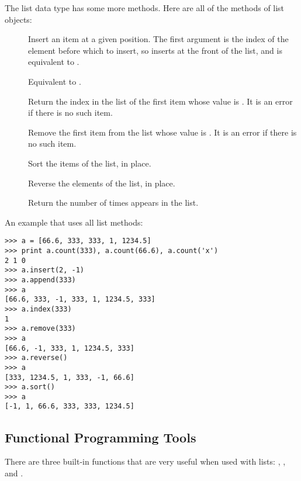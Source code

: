 \documentclass{manual}
\begin{document}
The list data type has some more methods.  Here are all of the methods
of list objects:

\begin{description}

\item[]
Insert an item at a given position.  The first argument is the index of
the element before which to insert, so  inserts at
the front of the list, and  is equivalent to
.

\item[]
Equivalent to .

\item[]
Return the index in the list of the first item whose value is .
It is an error if there is no such item.

\item[]
Remove the first item from the list whose value is .
It is an error if there is no such item.

\item[]
Sort the items of the list, in place.

\item[]
Reverse the elements of the list, in place.

\item[]
Return the number of times  appears in the list.

\end{description}

An example that uses all list methods:

\begin{verbatim}
>>> a = [66.6, 333, 333, 1, 1234.5]
>>> print a.count(333), a.count(66.6), a.count('x')
2 1 0
>>> a.insert(2, -1)
>>> a.append(333)
>>> a
[66.6, 333, -1, 333, 1, 1234.5, 333]
>>> a.index(333)
1
>>> a.remove(333)
>>> a
[66.6, -1, 333, 1, 1234.5, 333]
>>> a.reverse()
>>> a
[333, 1234.5, 1, 333, -1, 66.6]
>>> a.sort()
>>> a
[-1, 1, 66.6, 333, 333, 1234.5]
\end{verbatim}

\subsection{Functional Programming Tools \label{functional}}

There are three built-in functions that are very useful when used with
lists: , , and .
\end{document}

